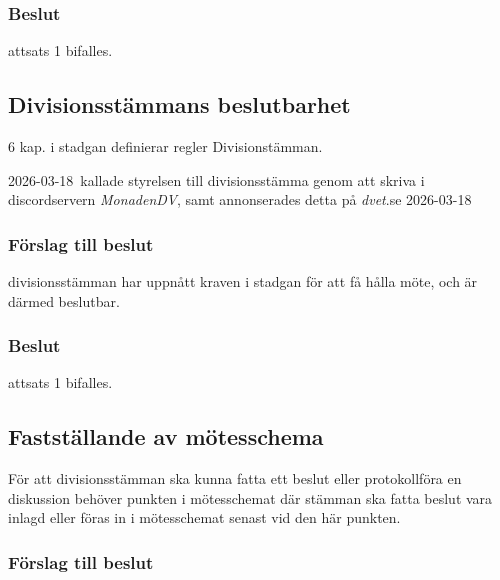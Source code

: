 \documentclass[protokoll]{dvd}
\def\kall{2026-03-18}
\begin{document}
\subsubsection*{Beslut}
\begin{attsatser}
    \item attsats 1 bifalles.
\end{attsatser}


\subsection{Divisionsstämmans beslutbarhet}

6 kap. i stadgan definierar regler Divisionstämman.

\kall \ 
kallade styrelsen till divisionsstämma genom att skriva i discordservern \emph{MonadenDV}, samt annonserades detta på \emph{dvet}.se \kall

\subsubsection*{Förslag till beslut}

\begin{attsatser}
    \item divisionsstämman har uppnått kraven i stadgan för att få hålla möte, och är därmed beslutbar.
\end{attsatser}

\subsubsection*{Beslut}
\begin{attsatser}
    \item attsats 1 bifalles.
\end{attsatser}


\subsection{Fastställande av mötesschema}

För att divisionsstämman ska kunna fatta ett beslut eller protokollföra en diskussion behöver punkten i mötesschemat där stämman ska fatta beslut vara inlagd eller föras in i mötesschemat senast vid den här punkten.

\subsubsection*{Förslag till beslut}
\end{document}
